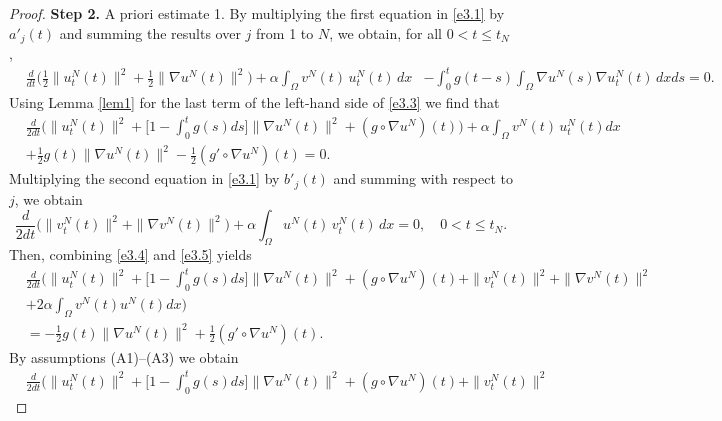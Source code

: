 \documentclass[reqno]{amsart}
\begin{document}
\begin{proof}
\noindent\textbf{Step 2.} A priori estimate 1.
By multiplying the first equation in \eqref{e3.1} by \(a'_j(t)\) and summing the results over \(j\)
from 1 to \(N\), we obtain, for all \(0 < t \leq t_N\),
\begin{equation}
\begin{aligned}
&\frac{d}{dt} \Big( \frac{1}{2} \| u^N_{t}(t) \|^2 + \frac{1}{2} \| \nabla u^N(t) \|^2 \Big)
+ \alpha \int_{\Omega} v^N(t) \, u^N_{t}(t) \, dx
&- \int_0^t g(t-s) \int_{\Omega} \nabla u^N(s) \nabla u^N_{t}(t) \, dx ds =0.
\end{aligned}\label{e3.3}
\end{equation}
Using Lemma \ref{lem1} for the last term of the left-hand side of \eqref{e3.3}
we find that
\begin{equation}
\begin{aligned}
&\frac{d}{2dt} \Big( \| u^N_{t}(t) \|^2
+ \Big[ 1-\int_0^t g(s) ds \Big] \| \nabla u^N(t) \|^2 + (g\circ \nabla u^N)(t) \Big)
+\alpha \int_{\Omega} v^N(t) \, u^N_{t}(t) dx \\
& +\frac{1}{2} g(t)\parallel \nabla u^N(t) \parallel^2 - \frac{1}{2}( g'\circ\nabla u^N) (t) =0.
\end{aligned} \label{e3.4}
 \end{equation}
Multiplying the second equation in \eqref{e3.1} by $b'_j(t)$ and summing with respect to $j$, we obtain
 \begin{equation}
 \frac{d}{2 dt} \Big( \| v^N_{t}(t) \|^2 + \| \nabla v^N (t) \|^2 \Big)
 + \alpha \int_{\Omega} u^N(t) \, v^N_{t}(t) \, dx =0, \quad 0 < t \leq t_N.
 \label{e3.5}
\end{equation}
Then, combining \eqref{e3.4} and \eqref{e3.5} yields
\begin{equation}
\begin{aligned}
 &\frac{d}{2 dt} \Big( \| u^N_{t}(t) \|^2 + \Big[ 1-\int_0^t g(s)ds\Big]
 \| \nabla u^N(t) \|^2 +(g\circ\nabla u^N)(t)+\| v^N_{t}(t) \|^2 + \| \nabla v^N(t) \|^2 \\
 &+ 2 \alpha \int_{\Omega} v^N(t) u^N(t) dx\Big) \\
&=-\frac{1}{2} g(t)\parallel \nabla u^N(t) \parallel^2 + \frac{1}{2}( g'\circ\nabla u^N )(t).
\end{aligned}\label{e3.6}
\end{equation}
By assumptions (A1)--(A3) we obtain
 \begin{equation}
\begin{aligned}
&\frac{d}{2 dt} \Big( \| u^N_{t} (t) \|^2 + \Big[ 1-\int_0^t g(s)ds\Big]
 \| \nabla u^N(t) \|^2 +(g\circ\nabla u^N)(t)+\| v^N_{t}(t) \|^2

\end{aligned}
\end{equation}
\end{proof}
\end{document}
